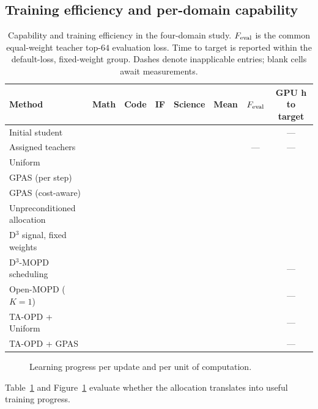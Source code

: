 \subsection{Training efficiency and per-domain capability}

\begin{table}[t]
\centering
\small
\setlength{\tabcolsep}{3pt}
\caption{Capability and training efficiency in the four-domain study.
$F_{\rm eval}$ is the common equal-weight teacher top-$64$ evaluation
loss. Time to target is reported within the default-loss, fixed-weight
group. Dashes denote inapplicable entries; blank cells await measurements.}
\label{tab:main_results}
\begin{tabular}{lccccccc}
\toprule
Method & Math & Code & IF & Science & Mean & $F_{\rm eval}$ & GPU h to target \\
\midrule
Initial student & & & & & & & --- \\
Assigned teachers & & & & & & --- & --- \\
\midrule
Uniform & & & & & & & \\
GPAS (per step) & & & & & & & \\
GPAS (cost-aware) & & & & & & & \\
Unpreconditioned allocation & & & & & & & \\
D$^3$ signal, fixed weights & & & & & & & \\
\midrule
D$^3$-MOPD scheduling & & & & & & & --- \\
Open-MOPD ($K=1$) & & & & & & & --- \\
TA-OPD + Uniform & & & & & & & --- \\
TA-OPD + GPAS & & & & & & & --- \\
\bottomrule
\end{tabular}
\end{table}

\begin{figure}[t]
    \centering
    \caption{Learning progress per update and per unit of computation.}
    \label{fig:training_efficiency}
\end{figure}

Table~\ref{tab:main_results} and Figure~\ref{fig:training_efficiency}
evaluate whether the allocation translates into useful training progress.

